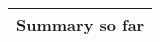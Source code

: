 \documentclass[25pt,landscape]{foils}
\newcommand{\Gray}{\textcolor{mygray}}
\newcommand{\LightGray}{\textcolor{mylightgray}}
\newcommand{\Green}{\textcolor{mypine}}
\newcommand{\myfoilhead}[1]{
\newpage
\vspace*{-1cm}
\Gray{
\begin{tabular*}{\textwidth}{l}
{\bf \Huge #1} \\
\bottomrule
\end{tabular*}}}
\newcommand{\mymessage}[2]{
\newpage
\vspace*{-1cm}
\vfill
\begin{tabular*}{\textwidth}{l}
{\bf \Huge #1} \\[0.3in]
\hspace*{0.1\linewidth}\begin{minipage}{0.89\linewidth}
    \Large #2
\end{minipage}\\
\end{tabular*}
\vfill
}
\newcommand{\te}{\!=\!}
\begin{document}
% 
% 
% 
% 
% 
% 
% 
% 
% 
% 

\myfoilhead{Summary so far}

\vfill
\end{document}
